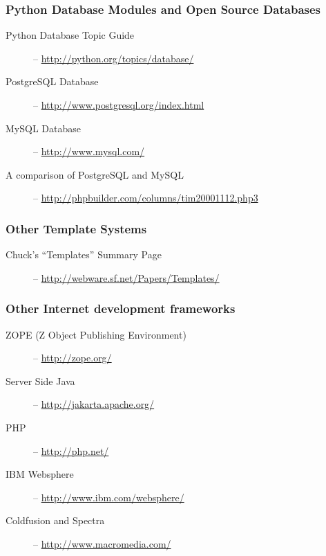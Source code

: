 \subsubsection{Python Database Modules and Open Source Databases}
\label{links.database}

\begin{description}
\item[Python Database Topic Guide] -- \url{http://python.org/topics/database/}
\item[PostgreSQL Database] -- \url{http://www.postgresql.org/index.html}
\item[MySQL Database] -- \url{http://www.mysql.com/}
\item[A comparison of PostgreSQL and MySQL] --
     \url{http://phpbuilder.com/columns/tim20001112.php3}
\end{description}

\subsubsection{Other Template Systems}
\label{links.other.templateSystems}

\begin{description}
\item[Chuck's ``Templates'' Summary Page] -- \url{http://webware.sf.net/Papers/Templates/}
\end{description}

\subsubsection{Other Internet development frameworks}
\label{links.internet}

\begin{description}
\item[ZOPE (Z Object Publishing Environment)] -- \url{http://zope.org/}
\item[Server Side Java] -- \url{http://jakarta.apache.org/}
\item[PHP] -- \url{http://php.net/}
\item[IBM Websphere] -- \url{http://www.ibm.com/websphere/}
\item[Coldfusion and Spectra] -- \url{http://www.macromedia.com/}
\end{description}


